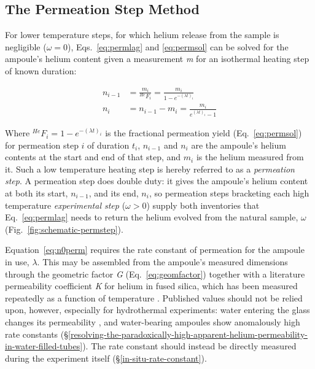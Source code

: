 \subsection{The Permeation Step Method}\label{permeation-step-method}

For lower temperature steps, for which helium release from the sample is negligible (\(\omega = 0\)), Eqs.~\eqref{eq:permlag} and \eqref{eq:permsol} can be solved for the ampoule's helium content given a measurement \emph{m} for an isothermal heating step of known duration:

\begin{equation}
\label{eq:n0perm}
\begin{aligned}
n_{i-1} &= \frac{m_i}{^{He}F_i} = \frac{m_i}{1 - e^{-(\lambda t)_i}} \\[1ex]
n_{i} &= n_{i-1} - m_i = \frac{m_i}{e^{(\lambda t)_i} - 1}
\end{aligned}
\end{equation}

Where \(^{He}F_i = 1 - e^{-(\lambda t)_i}\) is the fractional permeation yield (Eq.~\eqref{eq:permsol}) for permeation step \(i\) of duration \(t_i\), \(n_{i-1}\) and \(n_i\) are the ampoule's helium contents at the start and end of that step, and \(m_i\) is the helium measured from it. Such a low temperature heating step is hereby referred to as a \emph{permeation step}. A permeation step does double duty: it gives the ampoule's helium content at both its start, \(n_{i-1}\), and its end, \(n_i\), so permeation steps bracketing each high temperature \emph{experimental step} (\(\omega > 0\)) supply both inventories that Eq.~\eqref{eq:permlag} needs to return the helium evolved from the natural sample, \(\omega\) (Fig.~\ref{fig:schematic-permstep}).

Equation~\eqref{eq:n0perm} requires the rate constant of permeation for the ampoule in use, \(\lambda\). This may be assembled from the ampoule's measured dimensions through the geometric factor \emph{G} (Eq.~\eqref{eq:geomfactor}) together with a literature permeability coefficient \emph{K} for helium in fused silica, which has been measured repeatedly as a function of temperature \citep{norton1953,altemose1961,swets1961,masaryk1968}. Published values should not be relied upon, however, especially for hydrothermal experiments: water entering the glass changes its permeability \citep{shelby1972,tsuru2011}, and water-bearing ampoules show anomalously high rate constants (\S\ref{resolving-the-paradoxically-high-apparent-helium-permeability-in-water-filled-tubes}). The rate constant should instead be directly measured during the experiment itself (\S\ref{in-situ-rate-constant}).

